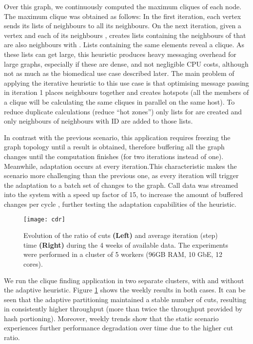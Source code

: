 \documentclass{sig-alternate-10pt}
\begin{document}
Over this graph, we continuously computed the maximum cliques of each node. The maximum clique was obtained as follows: In the first iteration, each vertex sends its lists of neighbours to all its neighbours. On the next iteration, given a vertex  and each of its neighbours ,  creates  lists containing the neighbours of  that are also neighbours with . Lists containing the same elements reveal a clique. As these lists can get large, this heuristic produces heavy messaging overhead for large graphs, especially if these are dense, and not negligible CPU costs, although not as much as the biomedical use case described later. The main problem of applying the iterative heuristic to this use case is that optimising message passing in iteration 1 places neighbours together and creates hotspots (all the members of a clique will be calculating the same cliques in parallel on the same host). To reduce duplicate calculations (reduce ``hot zones'') only lists for  are created and only neighbours of neighbours with ID  are added to those lists.
 
In contrast with the previous scenario, this application requires freezing the graph topology until a result is obtained, therefore  buffering all the graph changes until the computation finishes (for two iterations instead of one). Meanwhile, adaptation occurs at every iteration.This characteristic makes the scenario more challenging than the previous one, as every iteration will trigger the adaptation to a batch set of changes to the graph. Call data was streamed into the system with a speed up factor of 15, to increase the amount of buffered changes per cycle , further testing the adaptation capabilities of the heuristic. 

\begin{figure}[t]
\centering
\texttt{[image: cdr]}

\caption{Evolution of the ratio of cuts \textbf{(Left)} and average iteration (step) time \textbf{(Right)} during the 4 weeks of available data. The experiments were performed in a cluster of 5 workers (96GB RAM, 10 GbE, 12 cores).}
\vspace{-15pt}
\label{fig:phonePerf}
\end{figure}


We run the clique finding application in two separate clusters, with and without the adaptive heuristic.  Figure \ref{fig:phonePerf} shows the weekly results in both cases. It can be seen that the adaptive partitioning maintained a stable number of cuts, resulting in consistently higher throughput (more than twice the throughput provided by hash portioning). Moreover, weekly trends show that the static scenario experiences further performance degradation over time due to the higher cut ratio. 
\end{document}
